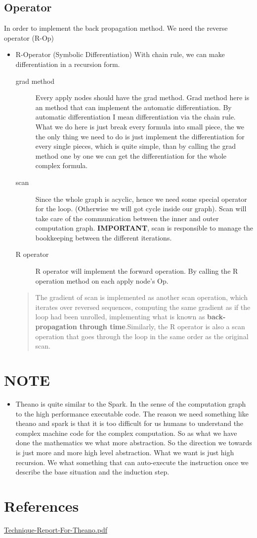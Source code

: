 \documentclass[11pt]{article}
\begin{document}
\subsection*{Operator}
\label{sec:orgheadline11}
In order to implement the back propagation method. We need the reverse operator (R-Op)
\begin{itemize}
\item R-Operator (Symbolic Differentiation)
\label{sec:orgheadline10}
With chain rule, we can make differentiation in a recursion form.
\begin{description}
\item[{grad method}] Every apply nodes should have the grad method. Grad method here is an method that can implement the automatic differentiation. By automatic differentiation I mean differentiation via the chain rule. What we do here is just break every formula into small piece, the we the only thing we need to do is just implement the differentiation for every single pieces, which is quite simple, than by calling the grad method one by one we can get the differentiation for the whole complex formula.
\item[{scan}] Since the whole graph is acyclic, hence we need some special operator for the loop. (Otherwise we will got cycle inside our graph). Scan will take care of the communication between the inner and outer computation graph. \textbf{IMPORTANT}, scan is responsible to manage the bookkeeping between the different iterations.
\item[{R operator}] R operator will implement the forward operation. By calling the R operation method on each apply node's Op.
\end{description}
\begin{quote}
The gradient of scan is implemented as another scan operation, which iterates over reversed sequences, computing the same gradient as if the loop had been unrolled, implementing what is known as \textbf{back-propagation through time}.Similarly, the R operator is also a scan operation that goes through the loop in the same order as the original scan. 
\end{quote}
\end{itemize}

\section*{\textbf{NOTE}}
\label{sec:orgheadline14}
\begin{itemize}
\item Theano is quite similar to the Spark.
\label{sec:orgheadline13}
In the sense of the computation graph to the high performance executable code. The reason we need something like theano and spark is that it is too difficult for us humans to understand the complex machine code for the complex computation. So as what we have done the mathematics we what more abstraction. So the direction we towards is just more and more high level abstraction. What we want is just high recursion. We what something that can auto-execute the instruction once we describe the base situation and the induction step.
\end{itemize}
\section*{References}
\label{sec:orgheadline15}
\href{http://arxiv.org/pdf/1605.02688v1.pdf}{Technique-Report-For-Theano.pdf}
\end{document}
